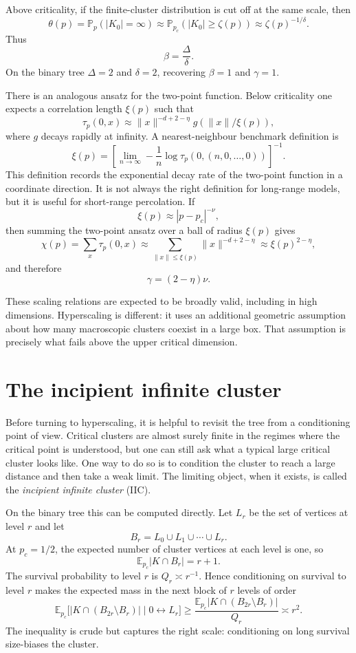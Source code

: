 \documentclass[11pt,reqno]{book}
\numberwithin{equation}{chapter}
\theoremstyle{plain}
\theoremstyle{definition}
\theoremstyle{remark}
\newcommand{\Pp}{\mathbb P_p}
\newcommand{\Pc}{\mathbb P_{p_c}}
\newcommand{\E}{\mathbb E}
\newcommand{\1}{\mathbf 1}
\newcommand{\norm}[1]{\lVert #1\rVert}
\newcommand{\as}{\asymp}
\begin{document}
Above criticality, if the finite-cluster distribution is cut off at the same scale, then
\[
  \theta(p)
  =
  \Pp(|K_0|=\infty)
  \approx
  \Pc(|K_0|\geq \zeta(p))
  \approx
  \zeta(p)^{-1/\delta}.
\]
Thus
\[
  \beta=\frac{\Delta}{\delta}.
\]
On the binary tree $\Delta=2$ and $\delta=2$, recovering $\beta=1$ and $\gamma=1$.

There is an analogous ansatz for the two-point function. Below criticality one expects a correlation length $\xi(p)$ such that
\[
  \tau_p(0,x)\approx \norm{x}^{-d+2-\eta} g(\norm{x}/\xi(p)),
\]
where $g$ decays rapidly at infinity. A nearest-neighbour benchmark definition is
\[
  \xi(p)
  =
  \left[
  \lim_{n\to\infty}
  -\frac1n\log \tau_p(0,(n,0,\ldots,0))
  \right]^{-1}.
\]
This definition records the exponential decay rate of the two-point function in a coordinate direction. It is not always the right definition for long-range models, but it is useful for short-range percolation. If
\[
  \xi(p)\approx |p-p_c|^{-\nu},
\]
then summing the two-point ansatz over a ball of radius $\xi(p)$ gives
\[
  \chi(p)
  =
  \sum_x \tau_p(0,x)
  \approx
  \sum_{\norm{x}\leq \xi(p)} \norm{x}^{-d+2-\eta}
  \approx
  \xi(p)^{2-\eta},
\]
and therefore
\[
  \gamma=(2-\eta)\nu.
\]

These scaling relations are expected to be broadly valid, including in high dimensions. Hyperscaling is different: it uses an additional geometric assumption about how many macroscopic clusters coexist in a large box. That assumption is precisely what fails above the upper critical dimension.

\section{The incipient infinite cluster}

Before turning to hyperscaling, it is helpful to revisit the tree from a conditioning point of view. Critical clusters are almost surely finite in the regimes where the critical point is understood, but one can still ask what a typical large critical cluster looks like. One way to do so is to condition the cluster to reach a large distance and then take a weak limit. The limiting object, when it exists, is called the \emph{incipient infinite cluster} (IIC).

On the binary tree this can be computed directly. Let $L_r$ be the set of vertices at level $r$ and let
\[
  B_r=L_0\cup L_1\cup\cdots\cup L_r.
\]
At $p_c=1/2$, the expected number of cluster vertices at each level is one, so
\[
  \E_{p_c}|K\cap B_r|=r+1.
\]
The survival probability to level $r$ is $Q_r\as r^{-1}$. Hence conditioning on survival to level $r$ makes the expected mass in the next block of $r$ levels of order
\[
  \E_{p_c}\bigl[|K\cap (B_{2r}\setminus B_r)|\mid 0\leftrightarrow L_r\bigr]
  \geq
  \frac{\E_{p_c}|K\cap (B_{2r}\setminus B_r)|}{Q_r}
  \as r^2.
\]
The inequality is crude but captures the right scale: conditioning on long survival size-biases the cluster.
\end{document}
